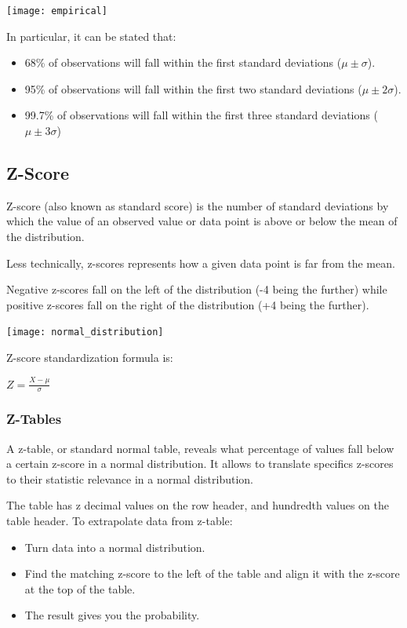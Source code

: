 \documentclass{article}
\begin{document}
\texttt{[image: empirical]}

In particular, it can be stated that:
\begin{itemize}
    \item 68\% of observations will fall within the first standard deviations ($\mu \pm \sigma $).
    \item 95\% of observations will fall within the first two standard deviations ($\mu \pm 2\sigma $).
    \item 99.7\% of observations will fall within the first three standard deviations ($\mu \pm 3\sigma $)
\end{itemize}

\subsection{Z-Score}
Z-score (also known as standard score) is the number of standard deviations by which the value of an observed value or data point is above or below the mean of the distribution. 

Less technically, z-scores represents how a given data point is far from the mean.

Negative z-scores fall on the left of the distribution (-4 being the further) while positive z-scores fall on the right of the distribution (+4 being the further).

\texttt{[image: normal\_distribution]}

Z-score standardization formula is:

$\displaystyle Z={\frac {X-\mu }{\sigma }}$

\subsubsection{Z-Tables}
A z-table, or standard normal table, reveals what percentage of values fall below a certain z-score in a normal distribution. It allows to translate specifics z-scores to their statistic relevance in a normal distribution.

The table has z decimal values on the row header, and hundredth values on the table header. 
To extrapolate data from z-table:
\begin{itemize}
    \item Turn data into a normal distribution.
    \item Find the matching z-score to the left of the table and align it with the z-score at the top of the table.
    \item The result gives you the probability. 
\end{itemize}
\end{document}

